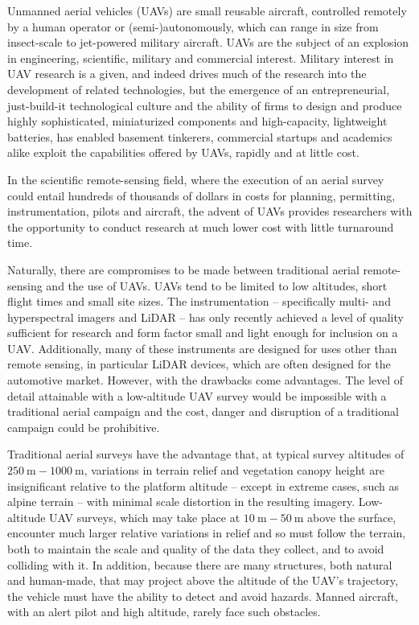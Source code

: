 \label{chapter:introduction}

Unmanned aerial vehicles (UAVs) are small reusable aircraft, controlled remotely by a human operator or (semi-)autonomously, which can range in size from insect-scale \cite{Avadhanula2002,Deng2003} to jet-powered military aircraft. UAVs are the subject of an explosion in engineering, scientific, military and commercial interest. Military interest in UAV research is a given, and indeed drives much of the research into the development of related technologies, but the emergence of an entrepreneurial, just-build-it technological culture and the ability of firms to design and produce highly sophisticated, miniaturized components and high-capacity, lightweight batteries, has enabled basement tinkerers, commercial startups and academics alike exploit the capabilities offered by UAVs, rapidly and at little cost.

In the scientific remote-sensing field, where the execution of an aerial survey could entail hundreds of thousands of dollars in costs for planning, permitting, instrumentation, pilots and aircraft, the advent of UAVs provides researchers with the opportunity to conduct research at much lower cost with little turnaround time. 

Naturally, there are compromises to be made between traditional aerial remote-sensing and the use of UAVs. UAVs tend to be limited to low altitudes, short flight times and small site sizes. The instrumentation -- specifically multi- and hyperspectral imagers and LiDAR -- has only recently achieved a level of quality sufficient for research and form factor small and light enough for inclusion on a UAV. Additionally, many of these instruments are designed for uses other than remote sensing, in particular LiDAR devices, which are often designed for the automotive market. However, with the drawbacks come advantages. The level of detail attainable with a low-altitude UAV survey would be impossible with a traditional aerial campaign and the cost, danger and disruption of a traditional campaign could be prohibitive.

Traditional aerial surveys have the advantage that, at typical survey altitudes of $\SI{250}\m-\SI{1000}\m$, variations in terrain relief and vegetation canopy height are insignificant relative to the platform altitude -- except in extreme cases, such as alpine terrain -- with minimal scale distortion in the resulting imagery. Low-altitude UAV surveys, which may take place at $\SI{10}\m-\SI{50}\m$ above the surface, encounter much larger relative variations in relief and so must follow the terrain, both to maintain the scale and quality of the data they collect, and to avoid colliding with it. In addition, because there are many structures, both natural and human-made, that may project above the altitude of the UAV's trajectory, the vehicle must have the ability to detect and avoid hazards. Manned aircraft, with an alert pilot and high altitude, rarely face such obstacles.

